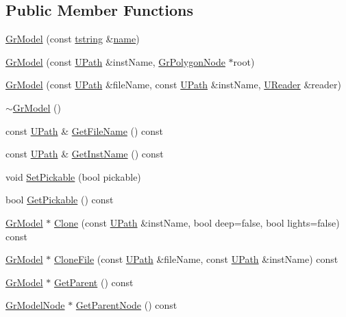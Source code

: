 \subsection*{Public Member Functions}
\begin{CompactItemize}
\item 
\hyperlink{class_gr_model_4def572ffb7a4575939f3286d566ac4a}{GrModel} (const \hyperlink{common__afx_8h_816fa58fd77499b0edb2c69ebe803d5c}{tstring} \&\hyperlink{glext__bak_8h_bb62efe59ccdd153ce42e1a418352209}{name})
\item 
\hyperlink{class_gr_model_15d52f8774a7781ad079f8bf3604226f}{GrModel} (const \hyperlink{class_u_path}{UPath} \&instName, \hyperlink{class_gr_polygon_node}{GrPolygonNode} $\ast$root)
\item 
\hyperlink{class_gr_model_2cf8487be82f62f575f549e0081435ae}{GrModel} (const \hyperlink{class_u_path}{UPath} \&fileName, const \hyperlink{class_u_path}{UPath} \&instName, \hyperlink{class_u_reader}{UReader} \&reader)
\item 
\hyperlink{class_gr_model_e48b47449f463e0b0a7b42943db1310c}{$\sim$GrModel} ()
\item 
const \hyperlink{class_u_path}{UPath} \& \hyperlink{class_gr_model_390da9636c9c396d1fa3241b72ff6166}{GetFileName} () const 
\item 
const \hyperlink{class_u_path}{UPath} \& \hyperlink{class_gr_model_e8a075163c88d6bf6623db37d65cd17a}{GetInstName} () const 
\item 
void \hyperlink{class_gr_model_155e00b717c10f201168f4dfc1f2c141}{SetPickable} (bool pickable)
\item 
bool \hyperlink{class_gr_model_fa97c9215a2c2dcee2df132561f03698}{GetPickable} () const 
\item 
\hyperlink{class_gr_model}{GrModel} $\ast$ \hyperlink{class_gr_model_29d55ee007063d294ee9097c56d9f453}{Clone} (const \hyperlink{class_u_path}{UPath} \&instName, bool deep=false, bool lights=false) const 
\item 
\hyperlink{class_gr_model}{GrModel} $\ast$ \hyperlink{class_gr_model_fe7a05f880c1d67b55ef8130971836d6}{CloneFile} (const \hyperlink{class_u_path}{UPath} \&fileName, const \hyperlink{class_u_path}{UPath} \&instName) const 
\item 
\hyperlink{class_gr_model}{GrModel} $\ast$ \hyperlink{class_gr_model_ad017a6434f66a1051a57920b0561098}{GetParent} () const 
\item 
\hyperlink{class_gr_model_node}{GrModelNode} $\ast$ \hyperlink{class_gr_model_3497944f601c7427a96f66cafc3a151e}{GetParentNode} () const 

\end{CompactItemize}
